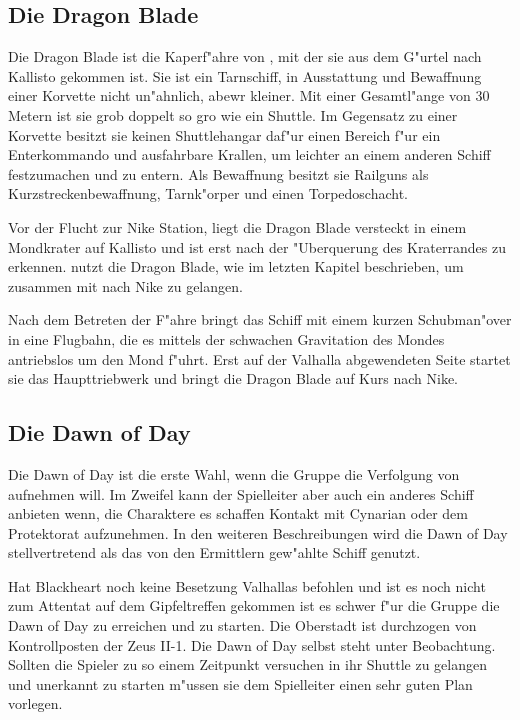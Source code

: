 \subsection{Die Dragon Blade}

Die Dragon Blade ist die Kaperf"ahre von \xl{}, mit der sie aus dem G"urtel nach Kallisto gekommen ist. Sie ist ein Tarnschiff, in Ausstattung und Bewaffnung einer Korvette nicht un"ahnlich, abewr kleiner. Mit einer Gesamtl"ange von 30 Metern ist sie grob doppelt so gro\3 wie ein Shuttle. Im Gegensatz zu einer Korvette besitzt sie keinen Shuttlehangar daf"ur einen Bereich f"ur ein Enterkommando und ausfahrbare Krallen, um leichter an einem anderen Schiff festzumachen und zu entern. Als Bewaffnung besitzt sie Railguns als Kurzstreckenbewaffnung, Tarnk"orper und einen Torpedoschacht. 

Vor der Flucht zur Nike Station, liegt die Dragon Blade versteckt in einem Mondkrater auf Kallisto und ist erst nach der "Uberquerung des Kraterrandes zu erkennen. \xl{} nutzt die Dragon Blade, wie im letzten Kapitel beschrieben, um zusammen mit \ml{} nach Nike zu gelangen. 

Nach dem Betreten der F"ahre bringt \xl{} das Schiff mit einem kurzen Schubman"over in eine Flugbahn, die es mittels der schwachen Gravitation des Mondes antriebslos um den Mond f"uhrt. Erst auf der Valhalla abgewendeten Seite startet sie das Haupttriebwerk und bringt die Dragon Blade auf Kurs nach Nike. 

\subsection{Die Dawn of Day}
Die Dawn of Day ist die erste Wahl, wenn die Gruppe die Verfolgung von \xl{} aufnehmen will. Im Zweifel kann der Spielleiter aber auch ein anderes Schiff anbieten wenn, die Charaktere es schaffen Kontakt mit Cynarian oder dem Protektorat aufzunehmen. In den weiteren Beschreibungen wird die Dawn of Day stellvertretend als das von den Ermittlern gew"ahlte Schiff genutzt.

Hat Blackheart noch keine Besetzung Valhallas befohlen und ist es noch nicht zum Attentat auf dem Gipfeltreffen gekommen ist es schwer f"ur die Gruppe die Dawn of Day zu erreichen und zu starten. Die Oberstadt ist durchzogen von Kontrollposten der Zeus II-1. Die Dawn of Day selbst steht unter Beobachtung. Sollten die Spieler zu so einem Zeitpunkt versuchen in ihr Shuttle zu gelangen und unerkannt zu starten m"ussen sie dem Spielleiter einen sehr guten Plan vorlegen.


